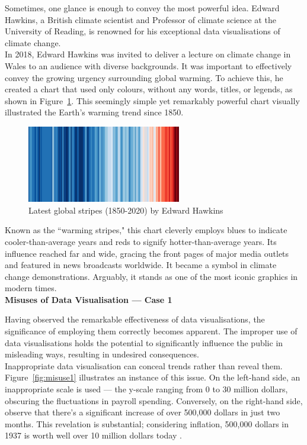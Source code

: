 \documentclass{article}\usepackage[]{graphicx}\usepackage[]{xcolor}
\numberwithin{equation}{section}
\begin{document}
\noindent
Sometimes, one glance is enough to convey the most powerful idea. Edward Hawkins, a British climate scientist and Professor of climate science at the University of Reading, is renowned for his exceptional data visualisations of climate change.\\

\noindent
In 2018, Edward Hawkins was invited to deliver a lecture on climate change in Wales to an audience with diverse backgrounds. It was important to effectively convey the growing urgency surrounding global warming. To achieve this, he created a chart that used only colours, without any words, titles, or legends, as shown in Figure~\ref{fig:global}. This seemingly simple yet remarkably powerful chart visually illustrated the Earth's warming trend since 1850.

\begin{figure}[H]
    \centering
    \includegraphics[width=0.6\textwidth]{image_reference/global.png}
    \caption{Latest global stripes (1850-2020) by Edward Hawkins \cite{blog}}
    \label{fig:global}
\end{figure}

\noindent 
Known as the ``warming stripes," this chart cleverly employs blues to indicate cooler-than-average years and reds to signify hotter-than-average years. Its influence reached far and wide, gracing the front pages of major media outlets and featured in news broadcasts worldwide. It became a symbol in climate change demonstrations. Arguably, it stands as one of the most iconic graphics in modern times.\\

\noindent
\textbf{Misuses of Data Visualisation — Case 1}

\noindent
Having observed the remarkable effectiveness of data visualisations, the significance of employing them correctly becomes apparent. The improper use of data visualisations holds the potential to significantly influence the public in misleading ways, resulting in undesired consequences.\\

\noindent
Inappropriate data visualisation can conceal trends rather than reveal them. Figure~\ref{fig:misuse1} illustrates an instance of this issue. On the left-hand side, an inappropriate scale is used — the y-scale ranging from 0 to 30 million dollars, obscuring the fluctuations in payroll spending. Conversely, on the right-hand side, observe that there's a significant increase of over 500,000 dollars in just two months. This revelation is substantial; considering inflation, 500,000 dollars in 1937 is worth well over 10 million dollars today \cite{worth}.
\end{document}
